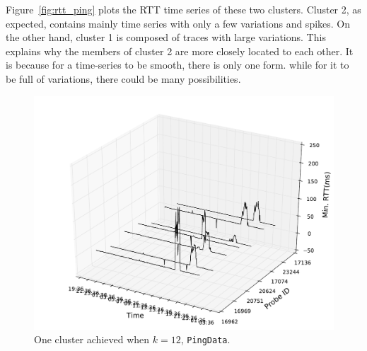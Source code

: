 Figure~\ref{fig:rtt_ping} plots the RTT time series of these two clusters. Cluster 2, as expected, contains mainly time series with only a few variations and spikes. 
On the other hand, cluster 1 is composed of traces with large variations.
This explains why the members of cluster 2 are more closely located to each other. 
It is because for a time-series to be smooth, there is only one form.
while for it to be full of variations, there could be many possibilities.

\begin{figure}[!htb]
\centering
\includegraphics[width=\textwidth]{gfx/chap3/rtt3d_ft_pam_cls8.pdf}
\caption{One cluster achieved when $k=12$, \texttt{PingData}.}
\label{fig:cls8_k12}
\end{figure}

